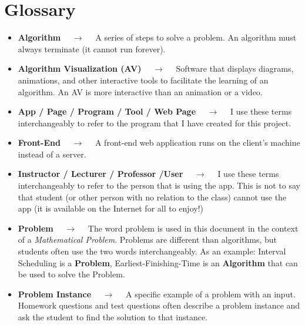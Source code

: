 \chapter{Glossary}
\begin{itemize}
	\item \textbf {Algorithm} 
	~~$\to$~~
	A series of steps to solve a problem. 
	An algorithm must always terminate (it cannot run forever).
	
	\item \textbf {Algorithm Visualization (AV)}
	~~$\to$~~
	Software that displays diagrams, animations, and other interactive tools 
	to facilitate the learning of an algorithm. An AV is more interactive than an 
	animation or a video. 
	
	\item \textbf {App  / Page / Program / Tool / Web Page}
	~~$\to$~~
	I use these terms interchangeably to refer to the program 
	that I have created for this project. 
	
	\item \textbf {Front-End}
	~~$\to$~~
	A front-end web application runs on the client's machine instead 
	of a server. 
		
	\item \textbf {Instructor / Lecturer / Professor /User}
	~~$\to$~~
	I use these terms interchangeably to refer to the person that is using
	the app. This is not to say that student
	(or other person with no relation to the class)
	cannot use the app (it is available on the Internet for all to enjoy!)
	
	\item \textbf {Problem}
	~~$\to$~~
	The word problem is used in this document in the context 
	of a \textit{Mathematical Problem}.  
	Problems are different than algorithms, but students often use 
	the two words interchangeably. 
	\subitem As an example: Interval Scheduling is a \textbf{Problem}, 
	Earliest-Finishing-Time is an \textbf{Algorithm} that can be used to
	solve the Problem.
	
	\item \textbf {Problem Instance}
	~~$\to$~~
	A specific example of a problem with an input. 
	Homework questions and test questions often describe a problem instance
	and ask the student to find the solution to that instance.
\end{itemize}
%

%
